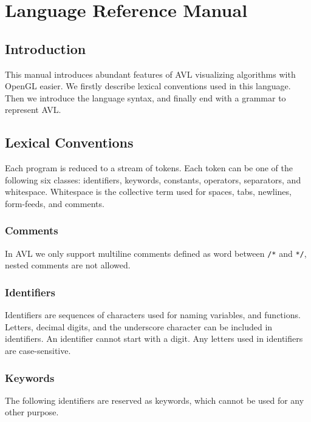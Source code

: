 \section{Language Reference Manual}

\subsection{Introduction}

This manual introduces abundant features of AVL visualizing algorithms with OpenGL easier. We
firstly describe lexical conventions used in this language. Then we introduce the language syntax,
and finally end with a grammar to represent AVL.

\subsection{Lexical Conventions}

Each program is reduced to a stream of tokens. Each token can be one of the following six classes:
identifiers, keywords, constants, operators, separators, and whitespace. Whitespace is the
collective term used for spaces, tabs, newlines, form-feeds, and comments.

\subsubsection{Comments}

In AVL we only support multiline comments defined as word between \verb"/*" and \verb"*/", nested
comments are not allowed.

\subsubsection{Identifiers}

Identifiers are sequences of characters used for naming variables, and functions. Letters, decimal
digits, and the underscore character can be included in identifiers. An identifier cannot start with
a digit. Any letters used in identifiers are case-sensitive.

\subsubsection{Keywords}

The following identifiers are reserved as keywords, which cannot be used for any other purpose.

